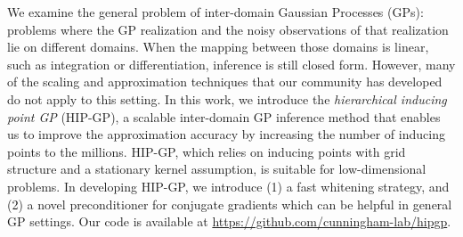 \noindent

We examine the general problem of inter-domain Gaussian Processes (GPs):
problems where the GP realization and
the noisy observations of that realization lie on different domains.
When the mapping between those domains is linear,
such as integration or differentiation,
inference is still closed form.
However, many of the scaling and approximation techniques
that our community has developed do not apply to this setting.
In this work, we introduce
the \emph{hierarchical inducing point GP} (HIP-GP),
a scalable inter-domain GP inference method
that enables us to improve the approximation accuracy
by increasing the number of inducing points to the millions.
HIP-GP, which
relies on inducing points with grid structure and a stationary kernel assumption,
is suitable for low-dimensional problems.
In developing HIP-GP, we introduce (1) a fast whitening strategy,
and (2) a novel preconditioner for conjugate gradients which
can be helpful in general GP settings. 
Our code is available at \url{https://github.com/cunningham-lab/hipgp}. 
